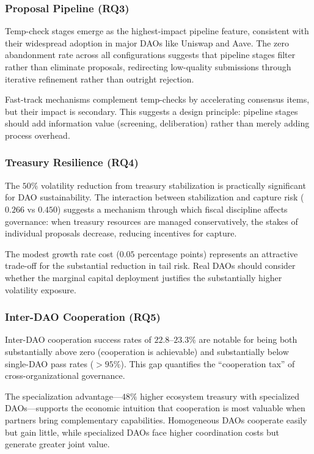 \subsubsection{Proposal Pipeline (RQ3)}

Temp-check stages emerge as the highest-impact pipeline feature, consistent with their widespread adoption in major DAOs like Uniswap and Aave. The zero abandonment rate across all configurations suggests that pipeline stages filter rather than eliminate proposals, redirecting low-quality submissions through iterative refinement rather than outright rejection.

Fast-track mechanisms complement temp-checks by accelerating consensus items, but their impact is secondary. This suggests a design principle: pipeline stages should add information value (screening, deliberation) rather than merely adding process overhead.

\subsubsection{Treasury Resilience (RQ4)}

The $50\%$ volatility reduction from treasury stabilization is practically significant for DAO sustainability. The interaction between stabilization and capture risk ($0.266$ vs $0.450$) suggests a mechanism through which fiscal discipline affects governance: when treasury resources are managed conservatively, the stakes of individual proposals decrease, reducing incentives for capture.

The modest growth rate cost ($0.05$ percentage points) represents an attractive trade-off for the substantial reduction in tail risk. Real DAOs should consider whether the marginal capital deployment justifies the substantially higher volatility exposure.

\subsubsection{Inter-DAO Cooperation (RQ5)}

Inter-DAO cooperation success rates of $22.8$--$23.3\%$ are notable for being both substantially above zero (cooperation is achievable) and substantially below single-DAO pass rates ($>95\%$). This gap quantifies the ``cooperation tax'' of cross-organizational governance.

The specialization advantage---$48\%$ higher ecosystem treasury with specialized DAOs---supports the economic intuition that cooperation is most valuable when partners bring complementary capabilities. Homogeneous DAOs cooperate easily but gain little, while specialized DAOs face higher coordination costs but generate greater joint value.

